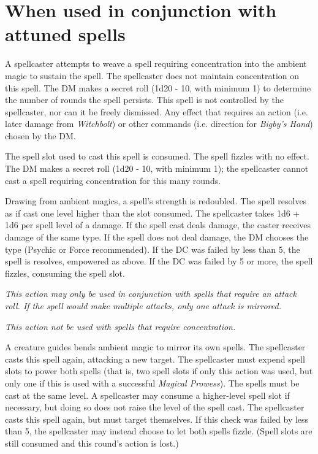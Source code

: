   \section*{When used in conjunction with attuned spells}

 \attuned A spellcaster attempts to weave
a spell requiring concentration into the ambient magic to sustain the
spell.  \success The spellcaster does not maintain concentration on
this spell.  The DM makes a secret roll (1d20 - 10, with minimum 1) to
determine the number of rounds the spell persists.  This spell is not
controlled by the spellcaster, nor can it be freely dismissed.  Any
effect that requires an action (i.e. later damage from {\it
  Witchbolt}) or other commands (i.e. direction for {\it Bigby's
  Hand}) chosen by the DM.

\failure The spell slot used to cast this spell is consumed.  The
spell fizzles with no effect.  The DM makes a secret roll (1d20 - 10,
with minimum 1); the spellcaster cannot cast a spell requiring
concentration for this many rounds.

 \attuned Drawing from
ambient magics, a spell's strength is redoubled.  \success The spell
resolves as if cast one level higher than the slot consumed.  \failure
The spellcaster takes 1d6 + 1d6 per spell level of a damage.  If the
spell cast deals damage, the caster receives damage of the same type.
If the spell does not deal damage, the DM chooses the type (Psychic or
Force recommended).  If the DC was failed by less than 5, the spell is
resolves, empowered as above.  If the DC was failed by 5 or more, the
spell fizzles, consuming the spell slot.

 \attuned

  {\it This action may only be used in conjunction with spells that
    require an attack roll.  If the spell would make multiple attacks,
    only one attack is mirrored.}

  {\it This action not be used with spells that require
    concentration.}

  A creature guides bends ambient magic to mirror its own spells.
  \success The spellcaster casts this spell again, attacking a new
  target.  The spellcaster must expend spell slots to power both
  spells (that is, two spell slots if only this action was used, but
  only one if this is used with a successful {\it Magical Prowess}).
  The spells must be cast at the same level.  A spellcaster may
  consume a higher-level spell slot if necessary, but doing so does
  not raise the level of the spell cast.  \failure The spellcaster
  casts this spell again, but must target themselves.  If this check
  was failed by less than 5, the spellcaster may instead choose to let
  both spells fizzle.  (Spell slots are still consumed and this
  round's action is lost.)

